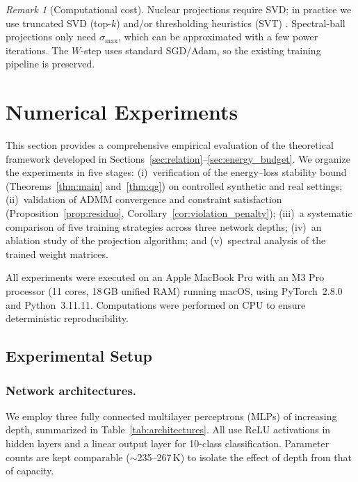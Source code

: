 \documentclass[a4paper,fleqn]{cas-sc}
\theoremstyle{remark}
\newtheorem{remark}{Remark}
\theoremstyle{definition}
\begin{document}
\begin{remark}[Computational cost]
Nuclear projections require SVD; in practice we use truncated SVD (top-$k$) and/or thresholding heuristics (SVT) \cite{Cai2010SVT}. Spectral-ball projections only need $\sigma_{\max}$, which can be approximated with a few power iterations. The $W$-step uses standard SGD/Adam, so the existing training pipeline is preserved.
\end{remark}

\section{Numerical Experiments}\label{sec:experiments}

This section provides a comprehensive empirical evaluation of the theoretical framework developed in Sections~\ref{sec:relation}--\ref{sec:energy_budget}. We organize the experiments in five stages: (i)~verification of the energy--loss stability bound (Theorems~\ref{thm:main} and~\ref{thm:qg}) on controlled synthetic and real settings; (ii)~validation of ADMM convergence and constraint satisfaction (Proposition~\ref{prop:residuo}, Corollary~\ref{cor:violation_penalty}); (iii)~a systematic comparison of five training strategies across three network depths; (iv)~an ablation study of the projection algorithm; and (v)~spectral analysis of the trained weight matrices.

All experiments were executed on an Apple MacBook Pro with an M3 Pro processor (11 cores, 18\,GB unified RAM) running macOS, using PyTorch~2.8.0 and Python~3.11.11. Computations were performed on CPU to ensure deterministic reproducibility.

\subsection{Experimental Setup}\label{sec:exp_setup}

\subsubsection{Network architectures.}
We employ three fully connected multilayer perceptrons (MLPs) of increasing depth, summarized in Table~\ref{tab:architectures}. All use ReLU activations in hidden layers and a linear output layer for 10-class classification. Parameter counts are kept comparable ($\sim$235--267\,K) to isolate the effect of depth from that of capacity.
\end{document}
